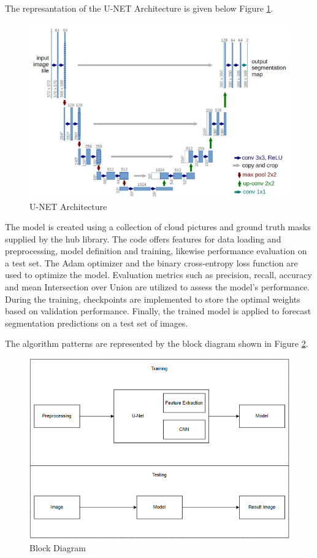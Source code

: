 \documentclass[conference]{IEEEtran}
\begin{document}
The represantation of the U-NET Architecture is given below Figure \ref{unet}.
\begin{figure}[!htbp]
    \centering
    \includegraphics[scale=0.3]{images/unet.png}
    \caption{U-NET Architecture}
    \label{unet}
\end{figure}

The model is created using a collection of cloud pictures and ground truth masks supplied by the hub library. The code offers features for data loading and preprocessing, model definition and training, likewise performance evaluation on a test set. The Adam optimizer and the binary cross-entropy loss function are used to optimize the model. Evaluation metrics such as precision, recall, accuracy and mean Intersection over Union are utilized to assess the model's performance. During the training, checkpoints are implemented to store the optimal weights based on validation performance. Finally, the trained model is applied to forecast segmentation predictions on a test set of images.

The algorithm patterns are represented by the block diagram shown in Figure \ref{block}.

\begin{figure}[!htbp]
    \centering
    \includegraphics[scale=0.5]{images/blok_diyagram.png}
    \caption{Block Diagram}
    \label{block}
\end{figure}
\end{document}
